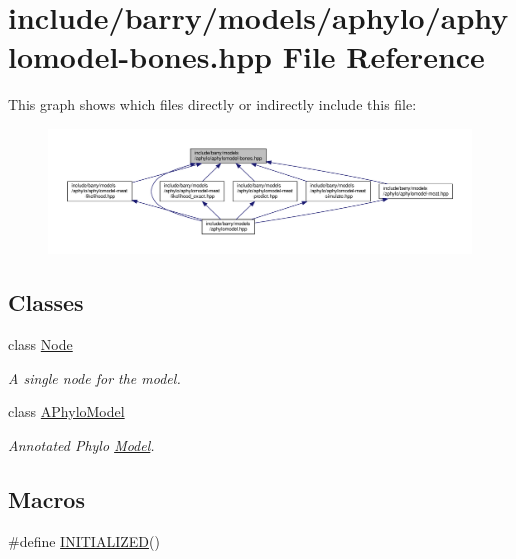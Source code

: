 \hypertarget{aphylomodel-bones_8hpp}{}\section{include/barry/models/aphylo/aphylomodel-\/bones.hpp File Reference}
\label{aphylomodel-bones_8hpp}
This graph shows which files directly or indirectly include this file\+:
\nopagebreak
\begin{figure}[H]
\begin{center}
\leavevmode
\includegraphics[width=350pt]{aphylomodel-bones_8hpp__dep__incl}
\end{center}
\end{figure}
\subsection*{Classes}
\begin{DoxyCompactItemize}
\item 
class \hyperlink{class_node}{Node}
\begin{DoxyCompactList}\small\item\em A single node for the model. \end{DoxyCompactList}\item 
class \hyperlink{class_a_phylo_model}{A\+Phylo\+Model}
\begin{DoxyCompactList}\small\item\em Annotated Phylo \hyperlink{class_model}{Model}. \end{DoxyCompactList}\end{DoxyCompactItemize}
\subsection*{Macros}
\begin{DoxyCompactItemize}
\item 
\#define \hyperlink{aphylomodel-bones_8hpp_a08888c91f4cab1da64c8f8bf10b59c40}{I\+N\+I\+T\+I\+A\+L\+I\+Z\+ED}()
\end{DoxyCompactItemize}
